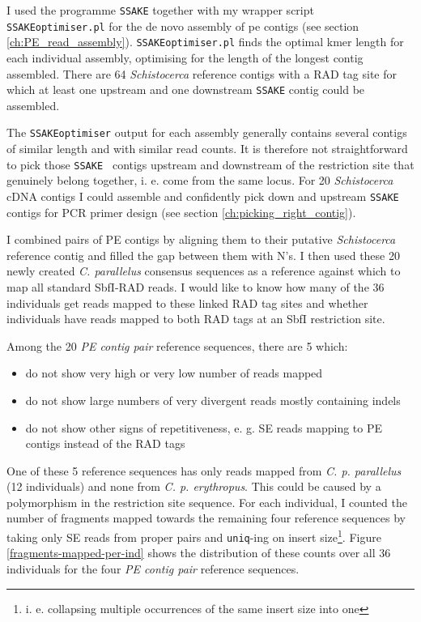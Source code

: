 \documentclass[a4paper,12pt,times,print,index,custombib,custommargin]{PhDThesisPSnPDF}\usepackage[]{graphicx}\usepackage[]{color}
\begin{document}
I used the programme \texttt{SSAKE} \citep{Warren2007} together with my wrapper script \texttt{SSAKEoptimiser.pl} for the de novo assembly of \gls{pe} contigs (see section \ref{ch:PE_read_assembly}). \texttt{SSAKEoptimiser.pl} finds the optimal \gls{kmer} length for each individual assembly, optimising for the length of the longest contig assembled. There are 64 \textit{Schistocerca} reference contigs with a RAD tag site for which at least one upstream and one downstream \texttt{SSAKE} contig could be assembled.

The \texttt{SSAKEoptimiser} output for each assembly generally contains several \glspl{contig} of similar length and with similar read counts. It is therefore not straightforward to pick those \texttt{SSAKE } contigs upstream and downstream of the restriction site that genuinely belong together, i. e. come from the same locus. For 20 \textit{Schistocerca} cDNA contigs I could assemble and confidently pick down and upstream \texttt{SSAKE} contigs for PCR primer design (see section \ref{ch:picking_right_contig}). 

I combined pairs of PE contigs by aligning them to their putative \textit{Schistocerca} reference contig and filled the gap between them with N's. I then used these 20 newly created \textit{C. parallelus} consensus sequences as a reference against which to map all standard SbfI-RAD reads. I would like to know how many of the 36 individuals get reads mapped to these \glspl{linked RAD tag site} and whether individuals have reads mapped to both \glspl{RAD tag} at an SbfI restriction site.

Among the 20 \emph{PE contig pair} reference sequences, there are 5 which:

\begin{itemize}
\item do not show very high or very low number of reads mapped
\item do not show large numbers of very divergent reads mostly containing \glspl{indel}
\item do not show other signs of repetitiveness, e. g. SE reads mapping to PE contigs instead of the \glspl{RAD tag}
\end{itemize}

One of these 5 reference sequences has only reads mapped from \textit{C. p. parallelus} (12 individuals) and none from \textit{C. p. erythropus}. This could be caused by a polymorphism in the restriction site sequence. For each individual, I counted the number of \glspl{fragment} mapped towards the remaining four reference sequences by taking only SE reads from \glspl{proper pair} and \texttt{uniq}-ing on insert size\footnote{i. e. collapsing multiple occurrences of the same insert size into one}. Figure \ref{fragments-mapped-per-ind} shows the distribution of these counts over all 36 individuals for the four \emph{PE contig pair} reference sequences.
\end{document}
